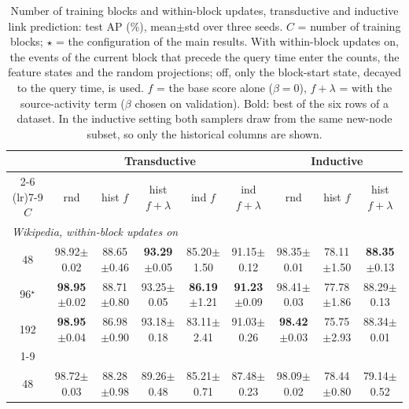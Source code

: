 \begin{table}[p]
\caption{Number of training blocks and within-block updates, transductive and inductive link prediction: test AP (\%), mean{\scriptsize$\pm$std} over three seeds. $C$ = number of training blocks; $\star$ = the configuration of the main results. With within-block updates on, the events of the current block that precede the query time enter the counts, the feature states and the random projections; off, only the block-start state, decayed to the query time, is used. $f$ = the base score alone ($\beta=0$), $f{+}\lambda$ = with the source-activity term ($\beta$ chosen on validation). Bold: best of the six rows of a dataset. In the inductive setting both samplers draw from the same new-node subset, so only the historical columns are shown.}
\label{tab:a2_event_clock}
\centering
\footnotesize
\setlength{\tabcolsep}{2.5pt}
\renewcommand{\arraystretch}{0.92}
\begin{tabular}{ccccccccc}
\toprule
 & \multicolumn{5}{c}{Transductive} & \multicolumn{3}{c}{Inductive} \\
\cmidrule(lr){2-6} \cmidrule(lr){7-9}
$C$ & rnd & hist $f$ & hist $f{+}\lambda$ & ind $f$ & ind $f{+}\lambda$ & rnd & hist $f$ & hist $f{+}\lambda$ \\
\midrule
\multicolumn{9}{l}{\textit{Wikipedia, within-block updates on}} \\
48 & 98.92{\scriptsize$\pm$0.02} & 88.65{\scriptsize$\pm$0.46} & \textbf{93.29}{\scriptsize$\pm$0.05} & 85.20{\scriptsize$\pm$1.50} & 91.15{\scriptsize$\pm$0.12} & 98.35{\scriptsize$\pm$0.01} & 78.11{\scriptsize$\pm$1.50} & \textbf{88.35}{\scriptsize$\pm$0.13} \\
96$^\star$ & \textbf{98.95}{\scriptsize$\pm$0.02} & 88.71{\scriptsize$\pm$0.80} & 93.25{\scriptsize$\pm$0.05} & \textbf{86.19}{\scriptsize$\pm$1.21} & \textbf{91.23}{\scriptsize$\pm$0.09} & 98.41{\scriptsize$\pm$0.03} & 77.78{\scriptsize$\pm$1.86} & 88.29{\scriptsize$\pm$0.13} \\
192 & \textbf{98.95}{\scriptsize$\pm$0.04} & 86.98{\scriptsize$\pm$0.90} & 93.18{\scriptsize$\pm$0.18} & 83.11{\scriptsize$\pm$2.41} & 91.03{\scriptsize$\pm$0.26} & \textbf{98.42}{\scriptsize$\pm$0.03} & 75.75{\scriptsize$\pm$2.93} & 88.34{\scriptsize$\pm$0.01} \\
\cmidrule(lr){1-9}
\multicolumn{9}{l}{\textit{Wikipedia, within-block updates off}} \\
48 & 98.72{\scriptsize$\pm$0.03} & 88.28{\scriptsize$\pm$0.98} & 89.26{\scriptsize$\pm$0.48} & 85.21{\scriptsize$\pm$0.71} & 87.48{\scriptsize$\pm$0.23} & 98.09{\scriptsize$\pm$0.02} & 78.44{\scriptsize$\pm$0.80} & 79.14{\scriptsize$\pm$0.52} \\

\end{tabular}
\end{table}
